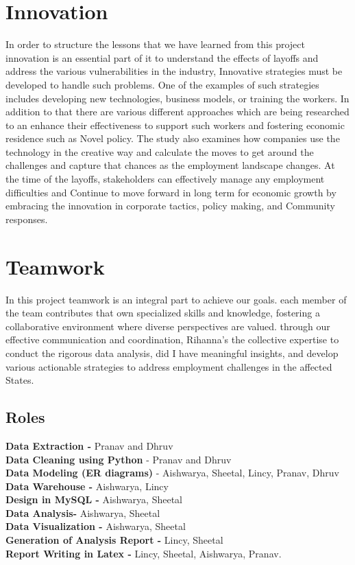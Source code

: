 \section{\Large\textbf{Innovation}}
{In order to structure the lessons that we have learned from this project innovation is an essential part of it to understand the effects of layoffs and address the various vulnerabilities in the industry, Innovative strategies must be developed to handle such problems. One of the examples of such strategies includes developing new technologies, business models, or   training the workers. In addition to that there are various different approaches which are being researched to an enhance their effectiveness to support such workers  and fostering economic residence such as Novel policy. The study also examines how companies use the technology in the creative way and calculate the moves to get around the challenges and capture that chances as the employment landscape changes. At the time of the layoffs, stakeholders can effectively manage any employment difficulties and Continue to move forward in long term for economic growth by embracing the innovation in corporate tactics, policy making, and Community responses. 
}

\section{\Large\textbf{Teamwork}}
{In this project teamwork is an integral part to achieve our goals. each member of the team contributes that own specialized skills and knowledge, fostering a collaborative environment where diverse perspectives are valued. through our effective communication and coordination, Rihanna's the collective expertise to conduct the rigorous data analysis, did I have meaningful insights, and develop various actionable strategies to address employment challenges in the affected States.
}

\subsection{Roles} 
{\textbf{Data Extraction -} Pranav and Dhruv\\
\textbf{Data Cleaning using Python}  - Pranav and Dhruv\\
\textbf{Data Modeling (ER diagrams)} - Aishwarya, Sheetal, Lincy, Pranav, Dhruv\\
\textbf{Data Warehouse -} Aishwarya, Lincy\\
\textbf{Design in MySQL -} Aishwarya, Sheetal\\
\textbf{Data Analysis-} Aishwarya, Sheetal\\
\textbf{Data Visualization - }Aishwarya, Sheetal\\
\textbf{Generation of Analysis Report  -} Lincy, Sheetal\\
\textbf{Report Writing in Latex -} Lincy, Sheetal, Aishwarya, Pranav.}

